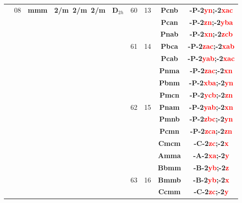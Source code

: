 \documentclass{article}      %
\begin{document}
\begin{small}
\begin{longtable}[c]{|c|c|c|c|c|c|c|c|c|}
	  & \textrm{08} &\textbf{mmm} &\textbf{2/m~2/m~2/m}  &$\mathbf{D}_{2h}$ &\textrm{60}  &\textrm{13} &\textbf{Pcnb}         &\textbf{-P-2\textcolor{red}{yn};-2\textcolor{red}{xac}}\\\cline{8-9}      
          &  & & & &  & &\textbf{Pcan}         &\textbf{-P-2\textcolor{red}{zn};-2\textcolor{red}{yba}}\\\cline{8-9}      
          &  & & & &  & &\textbf{Pnab}         &\textbf{-P-2\textcolor{red}{xn};-2\textcolor{red}{zcb}}\\\cline{6-9}      
	  &  & & & &\textrm{61}  &\textrm{14} &\textbf{Pbca}         &\textbf{-P-2\textcolor{red}{zac};-2\textcolor{red}{xab}}\\\cline{8-9}     
          &  & & & &  & &\textbf{Pcab}         &\textbf{-P-2\textcolor{red}{yab};-2\textcolor{red}{xac}}\\\cline{6-9}     
          &  & & & &  & &\textbf{Pnma}         &\textbf{-P-2\textcolor{red}{zac};-2\textcolor{red}{xn}}\\\cline{8-9}      
          &  & & & &  & &\textbf{Pbnm}         &\textbf{-P-2\textcolor{red}{xba};-2\textcolor{red}{yn}}\\\cline{8-9}      
          &  & & & &  & &\textbf{Pmcn}         &\textbf{-P-2\textcolor{red}{ycb};-2\textcolor{red}{zn}}\\\cline{8-9}      
	  &  & & & &\textrm{62}  &\textrm{15} &\textbf{Pnam}         &\textbf{-P-2\textcolor{red}{yab};-2\textcolor{red}{xn}}\\\cline{8-9}      
          &  & & & &  & &\textbf{Pmnb}         &\textbf{-P-2\textcolor{red}{zbc};-2\textcolor{red}{yn}}\\\cline{8-9}      
          &  & & & &  & &\textbf{Pcmn}         &\textbf{-P-2\textcolor{red}{zca};-2\textcolor{red}{zn}}\\\cline{6-9}      
          &  & & & &  & &\textbf{Cmcm}         &\textbf{-C-2\textcolor{red}{zc};-2\textcolor{red}{x}}\\\cline{8-9}        
          &  & & & &  & &\textbf{Amma}         &\textbf{-A-2\textcolor{red}{xa};-2\textcolor{red}{y}}\\\cline{8-9}        
          &  & & & &  & &\textbf{Bbmm}         &\textbf{-B-2\textcolor{red}{yb};-2\textcolor{red}{z}}\\\cline{8-9}        
	  &  & & & &\textrm{63}  &\textrm{16} &\textbf{Bmmb}         &\textbf{-B-2\textcolor{red}{yb};-2\textcolor{red}{x}}\\\cline{8-9}        
          &  & & & &  & &\textbf{Ccmm}         &\textbf{-C-2\textcolor{red}{zc};-2\textcolor{red}{y}}\\\cline{8-9}        

\end{longtable}
\end{small}
\end{document}
